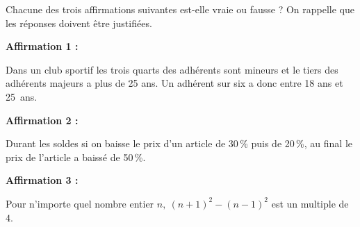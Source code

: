 
\medskip 
 
Chacune des trois affirmations suivantes est-elle vraie ou fausse ? On rappelle que les réponses doivent être justifiées.

\medskip
 
\textbf{Affirmation 1 :}
 
Dans un club sportif les trois quarts des adhérents sont mineurs et le tiers des adhérents majeurs a plus de 25 ans. Un adhérent sur six a donc entre 18 ans et 25~ans.

\medskip
 
\textbf{Affirmation 2 :}
 
Durant les soldes si on baisse le prix d'un article de 30\,\% puis de 20\,\%, au final le prix de l'article a baissé de 50\,\%.

\medskip
 
\textbf{Affirmation 3 :}
 
Pour n'importe quel nombre entier $n,\: (n + 1)^2 - (n - 1)^2$ est un multiple de $4$.
